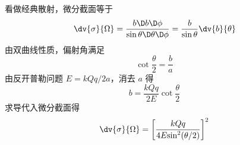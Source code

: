 
看做经典散射，微分截面等于
\begin{equation}
\dv{\sigma}{\Omega} = \frac{{b\D b\D \phi }}{{\sin \theta \D \theta \D \phi }} = \frac{b}{{\sin \theta }}\dv{b}{\theta}
\end{equation}
由双曲线性质，偏射角满足
\begin{equation}
\cot{\frac{\theta }{2}}= \frac{b}{a}
\end{equation}
由反开普勒问题  $E = {{kQq}}/{{2a}}$，消去 $a$ 得
\begin{equation}
b = \frac{{kQq}}{{2E}}\cot {\frac{\theta }{2}}
\end{equation}
求导代入微分截面得
\begin{equation}
\dv{\sigma}{\Omega} = {\left[ {\frac{{kQq}}{{4E{{\sin }^2}(\theta /2)}}} \right]^2}
\end{equation}
